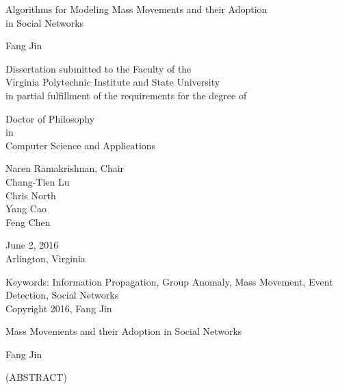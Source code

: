 \documentclass[12pt,dvips]{report}
\begin{document}
\thispagestyle{empty}
\begin{center}

{\Large
Algorithms for Modeling Mass Movements and their Adoption \\ in Social Networks
}


\vfill

Fang Jin

\vfill

Dissertation submitted to the Faculty of the \\
Virginia Polytechnic Institute and State University \\
in partial fulfillment of the requirements for the degree of

\vfill

Doctor of Philosophy \\
in \\
Computer Science and Applications

\vfill

Naren Ramakrishnan, Chair \\
Chang-Tien Lu \\
Chris North \\
Yang Cao \\
Feng Chen

\vfill

June 2, 2016\\
Arlington, Virginia

\vfill

Keywords: Information Propagation, Group Anomaly, Mass Movement, Event Detection, Social Networks
\\
Copyright 2016, Fang Jin

\end{center}

\pagebreak

\thispagestyle{empty}
\begin{center}

{\large
Mass Movements and their Adoption in Social Networks
}

\vfill

Fang Jin

\vfill

(ABSTRACT)
\vfill

\end{center}
\end{document}
